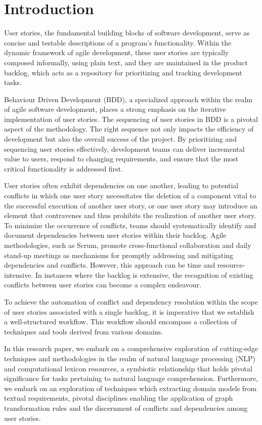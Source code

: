 \section{Introduction}
User stories, the fundamental building blocks of software development, serve as concise and testable descriptions of a program's functionality. Within the dynamic framework of agile development, these user stories are typically composed informally, using plain text, and they are maintained in the product backlog, which acts as a repository for prioritizing and tracking development tasks.

Behaviour Driven Development (BDD), a specialized approach within the realm of agile software development, places a strong emphasis on the iterative implementation of user stories. The sequencing of user stories in BDD is a pivotal aspect of the methodology. The right sequence not only impacts the efficiency of development but also the overall success of the project. By prioritizing and sequencing user stories effectively, development teams can deliver incremental value to users, respond to changing requirements, and ensure that the most critical functionality is addressed first.

User stories often exhibit dependencies on one another, leading to potential conflicts in which one user story necessitates the deletion of a component vital to the successful execution of another user story, or one user story may introduce an element that contravenes and thus prohibits the realization of another user story. To minimize the occurrence of conflicts, teams should systematically identify and document dependencies between user stories within their backlog. Agile methodologies, such as Scrum, promote cross-functional collaboration and daily stand-up meetings as mechanisms for promptly addressing and mitigating dependencies and conflicts. However, this approach can be time and resource-intensive. In instances where the backlog is extensive, the recognition of existing conflicts between user stories can become a complex endeavour.

To achieve the automation of conflict and dependency resolution within the scope of user stories associated with a single backlog, it is imperative that we establish a well-structured workflow. This workflow should encompass a collection of techniques and tools derived from various domains. 

In this research paper, we embark on a comprehensive exploration of cutting-edge techniques and methodologies in the realm of natural language processing (NLP) and computational lexicon resources, a symbiotic relationship that holds pivotal significance for tasks pertaining to natural language comprehension. Furthermore, we embark on an exploration of techniques which extracting domain models from textual requirements, pivotal disciplines enabling the application of graph transformation rules and the discernment of conflicts and dependencies among user stories.

